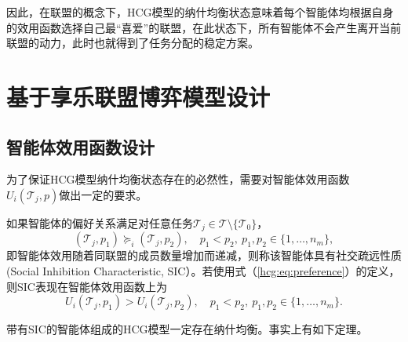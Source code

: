 因此，在联盟的概念下，HCG模型的纳什均衡状态意味着每个智能体均根据自身的效用函数选择自己最“喜爱”的联盟，在此状态下，所有智能体不会产生离开当前联盟的动力，此时也就得到了任务分配的稳定方案。



\section{基于享乐联盟博弈模型设计}
\label{hcg:HGTA}

\subsection{智能体效用函数设计}
\label{hcg:coalition}

为了保证HCG模型纳什均衡状态存在的必然性，需要对智能体效用函数$U_i(\mathcal{T}_j,p)$做出一定的要求。

\begin{definition}[社交疏远性质]
\label{hcg:eq:spao}
	如果智能体的偏好关系满足对任意任务$\mathcal{T}_j \in \mathcal{T} \setminus \{\mathcal{T}_0\}$，
	\begin{equation}
	\label{hcg:eq:spaoPrefer}
		(\mathcal{T}_j,p_1) \succeq_i (\mathcal{T}_j,p_2),\quad p_1 < p_2,\ p_1,p_2 \in \{1,\dots,n_m\},
	\end{equation}
	即智能体效用随着同联盟的成员数量增加而递减，则称该智能体具有社交疏远性质(Social Inhibition Characteristic, SIC）。若使用式（\ref{hcg:eq:preference}）的定义，则SIC表现在智能体效用函数上为
	\begin{equation}
	\label{hcg:eq:spaoU}
		U_i(\mathcal{T}_j,p_1) > U_i(\mathcal{T}_j,p_2),\quad p_1<p_2,\ p_1,p_2 \in \{1,\dots,n_m\}.
	\end{equation}
\end{definition}

带有SIC的智能体组成的HCG模型一定存在纳什均衡。事实上有如下定理。

